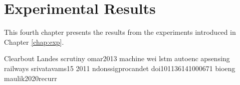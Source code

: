 \chapter{Experimental Results}
\label{chap:results}

This fourth chapter presents the results from the experiments introduced in Chapter \ref{chap:exp}. 






Clearbout \cite{claerbout1991scrutiny}
Landes scrutiny \cite{landes1951scrutiny}
omar2013 machine \cite{omar2013machine}
wei lstm autoenc \cite{wei2022lstmautoencoder}
apsensing railways \cite{apSensing2019railwaydas}
srivatavams15 \cite{DBLP:journals/corr/SrivastavaMS15}
2011 ndonssigprocandet \cite{2011ndongsigprocandet}
doi101136141000671 \cite{doi:10.1137/141000671}
bioeng \cite{bioengineering10040405}
maulik2020recurr \cite{maulik2020recurrent}




